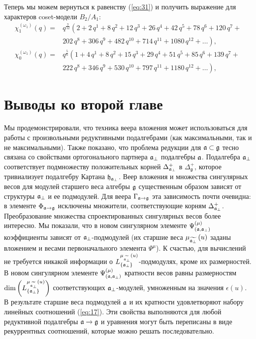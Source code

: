 Теперь мы можем вернуться к равенству (\ref{eq:31}) и получить выражение для характеров coset-модели $B_2/A_1$:
\begin{equation*}
  \label{eq:35}
  \begin{array}{cc}
    \chi^{(\omega_1)}_{1}(q)= & q^{\frac{7}{12}}\left( 2+2\,q^{1}+8\,q^{2}+12\,q^{3}+26\,q^{4}+42\,q^{5}+78\,q^{6}+120\,q^{7}+\right. \\
    & \left. 202\,q^{8}+306\,q^{9}+482\,q^{10}+714\,q^{11}+1080\,q^{12}+\dots \right),\\
    \chi^{(\omega_1)}_{0}(q) = & q^{\frac{5}{6}}\left(1 + 4\,q^{1}+ 8\,q^{2}+ 15\,q^{3}+ 29\,q^{4}+ 51\,q^{5}+ 85\,q^{6}+ 139\,q^{7}+\right. \\
    &\left. 222\,q^{8}+ 346\,q^{9}+ 530\,q^{10}+ 797\,q^{11}+ 1180\,q^{12}+\dots\right),
  \end{array}
\end{equation*}

\section{Выводы ко второй главе}
\label{sec:conclusion}

Мы продемонстрировали, что техника веера вложения может использоваться для работы с произвольными редуктивными подалгебрами (как максимальными, так и не максимальными). Также показано, что проблема редукции для  $\mathfrak{a} \subset \mathfrak{g}$ тесно связана со свойствами ортогонального партнера $ \mathfrak{a}_{\perp} $ подалгебры $\mathfrak{a}$. Подалгебра  $\mathfrak{a}_{\perp}$ соответствует подмножеству положительных корней $\Delta^{+}_{\mathfrak{a}_{\perp}}$ в $\Delta_{\mathfrak{g}}^{+}$, которое тривиализует подалгебру Картана $\mathfrak{h}_{\mathfrak{a}_{\perp}}$. Веер вложения и множества сингулярных весов для модулей старшего веса алгебры $\mathfrak{g}$ существенным образом зависят от структуры  $\mathfrak{a}_{\perp}$ и ее подмодулей.  Для веера  $\Gamma_{\mathfrak{a}\rightarrow \mathfrak{g}}$ эта зависимость почти очевидна: в элементе  $\Phi_{\mathfrak{a}\rightarrow \mathfrak{g}}$ исключены множители, соответствующие корням  $\Delta^{+}_{\mathfrak{a}_{\perp}}$. Преобразование множества спроектированных сингулярных весов более интересно. Мы показали, что в новом сингулярном элементе $\Psi ^{\left( \mu \right) }_{\left(  \mathfrak{a}, \mathfrak{a}_{\perp} \right)}$ коэффициенты зависят от $\mathfrak{a}_{\perp}$-подмодулей (их старшие веса $\mu _{\widetilde{\mathfrak{a}_{\perp}}}\left( u\right)$ заданы вложением и весами первоначального элемента $\Psi^{\mu}$). К счастью, для вычислений не требуется никакой информации о  $L^{\mu _{\widetilde{\mathfrak{a}_{\perp}}}\left( u\right)}_{\left\{ \mathfrak{a}_{\perp} \right\}}$-подмодулях, кроме их размерностей. В новом сингулярном элементе $\Psi ^{\left( \mu \right) }_{\left(  \mathfrak{a}, \mathfrak{a}_{\perp} \right)}$ кратности весов равны размерностям $\dim\left(L^{\mu _{\widetilde{\mathfrak{a}_{\perp}}}\left( u\right)}_{\left\{ \mathfrak{a}_{\perp} \right\}}\right)$ соответствующих  $\mathfrak{a}_{\perp}$-модулей, умноженным на значения $\epsilon (u)$. В результате старшие веса подмодулей $\mathfrak{a}$ и их кратности удовлетворяют набору линейных соотношений (\ref{eq:17}). Эти свойства выполняются для любой редуктивной подалгебры $\mathfrak{a}\rightarrow \mathfrak{g}$ и уравнения могут быть переписаны в виде рекуррентных соотношений, которые можно решать последовательно.

